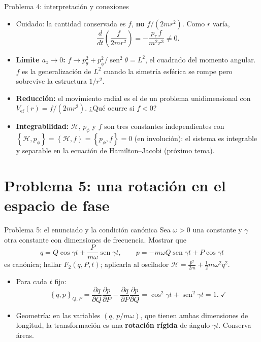 \documentclass[spanish]{beamer}
\providecommand{\sen}{\operatorname{sen}}
\newcommand{\Ham}{\mathcal{H}}
\newcommand{\pd}[2]{\frac{\partial #1}{\partial #2}}
\newcommand{\pb}[2]{\left\{#1,#2\right\}}   %
\begin{document}
\begin{frame}{Problema 4: interpretación y conexiones}
\begin{itemize}
  \item<1-> \alert{Cuidado:} la cantidad conservada es $f$, \textbf{no} $f/(2mr^2)$.
        Como $r$ varía,
        \[
          \frac{d}{dt}\left(\frac{f}{2mr^2}\right) = -\frac{p_r\, f}{m^2 r^3}\neq 0 .
        \]
  \item<2-> \textbf{Límite $a_z\to 0$:}
        $f \to p_\theta^2 + p_\phi^2/\sen^2\theta = L^2$, el cuadrado del momento
        angular. $f$ es la generalización de $L^2$ cuando la simetría esférica se
        rompe pero sobrevive la estructura $1/r^2$.
  \item<3-> \textbf{Reducción:} el movimiento radial es el de un problema
        unidimensional con $V_{\text{ef}}(r) = f/(2mr^2)$.
        ¿Qué ocurre si $f<0$?
  \item<4-> \textbf{Integrabilidad:} $\Ham$, $p_\phi$ y $f$ son tres constantes
        independientes con $\pb{\Ham}{p_\phi}=\pb{\Ham}{f}=\pb{p_\phi}{f}=0$
        (en involución): el sistema es integrable y separable en la ecuación de
        Hamilton--Jacobi (próximo tema).
\end{itemize}
\end{frame}

\section{Problema 5: una rotación en el espacio de fase}

\begin{frame}{Problema 5: el enunciado y la condición canónica}
Sea $\omega>0$ una constante y $\gamma$ otra constante con dimensiones de frecuencia.
Mostrar que
\[
  q = Q\cos\gamma t + \frac{P}{m\omega}\sen\gamma t, \qquad
  p = -m\omega Q\sen\gamma t + P\cos\gamma t
\]
es canónica; hallar $F_2(q,P,t)$; aplicarla al oscilador
$\Ham = \frac{p^2}{2m} + \frac12 m\omega^2 q^2$.
\pause
\begin{itemize}
  \item<2-> Para cada $t$ fijo:
  \[
    \pb{q}{p}_{Q,P} = \pd{q}{Q}\pd{p}{P} - \pd{q}{P}\pd{p}{Q}
    = \cos^2\gamma t + \sen^2\gamma t = 1 . \;\checkmark
  \]
  \item<3-> Geometría: en las variables $(q,\,p/m\omega)$, que tienen ambas
        dimensiones de longitud, la transformación es una \textbf{rotación rígida}
        de ángulo $\gamma t$. Conserva áreas.
\end{itemize}
\end{frame}
\end{document}
